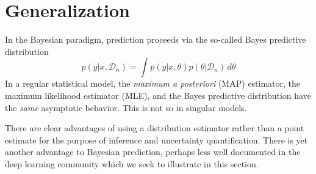 \documentclass{article} %
\begin{document}
\section{Generalization}\label{section:gen_error}
In the Bayesian paradigm, prediction proceeds via the so-called Bayes predictive distribution
\begin{equation}
p(y|x, \mathcal D_n) = \int p(y|x,\theta) p(\theta|\mathcal D_n) \,d\theta
\label{eq:bayes_pred_dist}
\end{equation}
In a regular statistical model, the \textit{maximum a posteriori} (MAP) estimator, the maximum likelihood estimator (MLE), and the Bayes predictive distribution have the \textit{same} asymptotic behavior. This is not so in singular models.


There are clear advantages of using a distribution estimator rather than a point estimate for the purpose of inference and uncertainty quantification.
There is yet another advantage to Bayesian prediction, perhaps less well documented in the deep learning community which we seek to illustrate in this section. 
\end{document}
